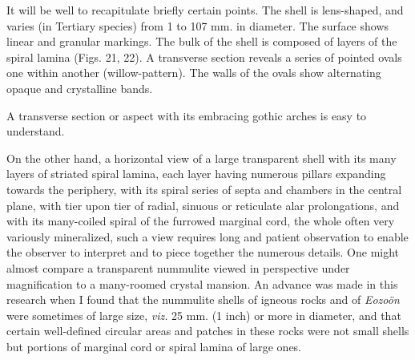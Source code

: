 \documentclass[a4paper, 12pt, oneside]{article}
\begin{document}
It will be well to recapitulate briefly certain points. The shell is lens-shaped, and varies (in Tertiary species) from 1 to 107 mm. in diameter. The surface shows linear and granular markings. The bulk of the shell is composed of layers of the spiral lamina (Figs. 21, 22). A transverse section reveals a series of pointed ovals one within another (willow-pattern). The walls of the ovals show alternating opaque and crystalline bands.

A transverse section or aspect with its embracing gothic arches is easy to understand.

On the other hand, a horizontal view of a large transparent shell with its many layers of striated spiral lamina, each layer having numerous pillars expanding towards the periphery, with its spiral series of septa and chambers in the central plane, with tier upon tier of radial, sinuous or reticulate alar prolongations, and with its many-coiled spiral of the furrowed marginal cord, the whole often very variously mineralized, such a view requires long and patient observation to enable the observer to interpret and to piece together the numerous details. One might almost compare a transparent nummulite viewed in perspective under magnification to a many-roomed crystal mansion. An advance was made in this research when I found that the nummulite shells of igneous rocks and of \emph{Eozoön} were sometimes of large size, \emph{viz.} 25 mm. (1 inch) or more in diameter, and that certain well-defined circular areas and patches in these rocks were not small shells but portions of marginal cord or spiral lamina of large ones.
\end{document}
